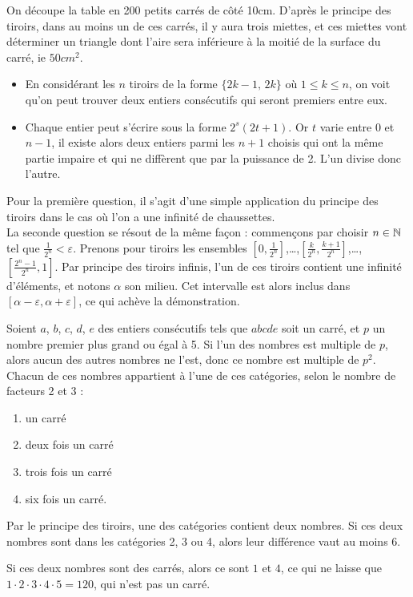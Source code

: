 \begin{sol}
On découpe la table en 200 petits carrés de côté 10cm. D'après le principe des tiroirs, dans au moins un de ces carrés, il y aura trois miettes, et ces miettes vont déterminer un triangle dont l'aire sera inférieure à la moitié de la surface du carré, ie $50cm^2$.
\end{sol}


\begin{sol}
\begin{itemize}
    \item En considérant les $n$ tiroirs de la forme $\{2k-1, \, 2k\}$ où $1 \le k \le n$, on voit qu'on peut trouver deux entiers consécutifs qui seront premiers entre eux.
    \item Chaque entier peut s'écrire sous la forme $2^s(2t+1)$. Or $t$ varie entre $0$ et $n-1$, il existe alors deux entiers parmi les $n + 1$ choisis qui ont la même partie impaire et qui ne diffèrent que par la puissance de 2. L'un divise donc l'autre.
\end{itemize}
\end{sol}


\begin{sol}
Pour la première question, il s'agit d'une simple application du principe des tiroirs dans le cas où l'on a une infinité de chaussettes.\\
La seconde question se résout de la même façon : commençons par choisir $n\in\mathbb N$ tel que $\frac{1}{2^n}<\varepsilon$. Prenons pour tiroirs les ensembles $\left[0,\frac1{2^n}\right]$,\dots,$\left[\frac{k}{2^n},\frac{k+1}{2^n}\right]$,\dots,$\left[\frac{2^n-1}{2^n},1\right]$. Par principe des tiroirs infinis, l'un de ces tiroirs contient une infinité d'éléments, et notons $\alpha$ son milieu. Cet intervalle est alors inclus dans $[\alpha-\varepsilon,\alpha+\varepsilon]$, ce qui achève la démonstration.
\end{sol}


\begin{sol}
Soient $a$, $b$, $c$, $d$, $e$ des entiers consécutifs tels que $abcde$ soit un carré, et $p$ un nombre premier plus grand ou égal à 5. Si l’un des nombres est multiple de $p$, alors aucun des autres nombres ne l’est, donc ce nombre est multiple de $p^2$.
\smallskip
\newline
Chacun de ces nombres appartient à l’une de ces catégories, selon le nombre de facteurs 2 et 3 :
\begin{enumerate}
\item un carré
\item deux fois un carré
\item trois fois un carré
\item six fois un carré.
\end{enumerate}
Par le principe des tiroirs, une des catégories contient deux nombres. Si ces deux nombres sont dans les catégories 2, 3 ou 4, alors leur différence vaut au moins $6$.

Si ces deux nombres sont des carrés, alors ce sont $1$ et $4$, ce qui ne laisse que $1 \cdot 2 \cdot 3 \cdot 4 \cdot 5 = 120$, qui n’est pas un carré.
\end{sol}


